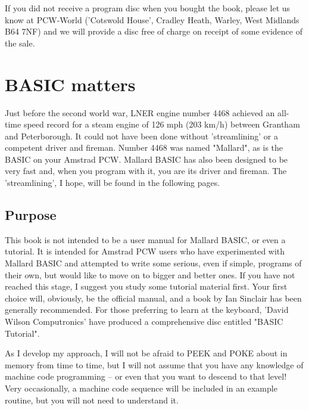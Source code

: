 \documentclass[]{report} %
\begin{document}
If you did not receive a program disc when you bought the book, please let  us 
know at PCW-World ('Cotswold House', Cradley Heath, Warley, West Midlands  B64 
7NF) and we will provide a disc free of charge on receipt of some evidence  of 
the sale.

\chapter{BASIC matters}
Just  before  the second world war, LNER engine number 4468 achieved an all-time
speed record for a steam engine of 126 mph (203 km/h) between Grantham and
Peterborough. It could not have been  done 
without  'streamlining'  or a competent driver and fireman.  Number  4468  was 
named  "Mallard", as is the BASIC on your Amstrad PCW. Mallard BASIC has  also 
been  designed  to  be very fast and, when you program with it,  you  are  its 
driver and fireman. The 'streamlining', I hope, will be found in the following 
pages.

\section{Purpose}
This  book  is not intended to be a user manual for Mallard BASIC, or  even  a 
tutorial.  It  is intended for Amstrad PCW users who  have  experimented  with 
Mallard BASIC and attempted to write some serious, even if simple, programs of 
their  own, but would like to move on to bigger and better ones. If  you  have 
not reached this stage, I suggest you study some tutorial material first. Your 
first  choice  will,  obviously, be the official manual, and  a  book  by  Ian 
Sinclair has been generally recommended. For those preferring to learn at  the 
keyboard,  'David  Wilson  Computronics' have produced  a  comprehensive  disc 
entitled "BASIC Tutorial".

As  I  develop  my approach, I will not be afraid to PEEK and  POKE  about  in 
memory from time to time, but I will not assume that you have any knowledge of 
machine  code programming -- or even that you want to descend to  that  level! 
Very  occasionally,  a machine code sequence will be included  in  an  example 
routine, but you will not need to understand it.
\end{document}
